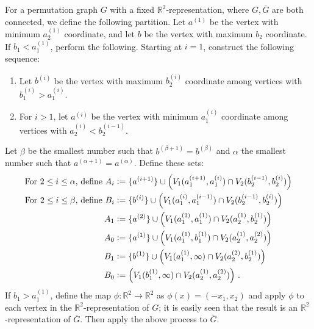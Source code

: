 \documentclass{theoretics}
\newcommand{\define}{\vcentcolon=}
\newcommand{\bR}{\ensuremath{\mathbb{R}}}
\begin{document}
\begin{definition}
	\label{def:permutation decomposition}
	For a permutation graph $G$ with a fixed $\bR^2$-representation, where $G,\overline G$ are both
	connected, we define the following partition.  Let $a^{(1)}$ be the vertex with minimum $a^{(1)}_2$
	coordinate, and let $b$ be the vertex with maximum $b_2$ coordinate. If $b_1 < a^{(1)}_1$, perform
	the following. Starting at $i=1$, construct the following sequence:
	\begin{enumerate}[label=\textup{(\arabic*)}]
		\item Let $b^{(i)}$ be the vertex with maximum $b^{(i)}_2$ coordinate among vertices with $b^{(i)}_1
		> a^{(i)}_1$.
		\item For $i > 1$, let $a^{(i)}$ be the vertex with minimum $a^{(i)}_1$ coordinate among
		vertices with $a^{(i)}_2 < b^{(i-1)}_2$.
	\end{enumerate}
	Let $\beta$ be the smallest number such that $b^{(\beta+1)}=b^{(\beta)}$ and $\alpha$ the smallest number
	such that $a^{(\alpha+1)}=a^{(\alpha)}$. Define these sets:
	\begin{align*}
		\text{For $2 \leq i \leq \alpha$, define } A_i &\define \{a^{(i+1)}\} \cup
		\left( V_1(a^{(i+1)}_1, a^{(i)}_1) \cap V_2(b^{(i-1)}_2, b^{(i)}_2) \right) \\
		\text{For $2 \leq i \leq \beta$, define } B_i &\define \{b^{(i)}\} \cup
		\left( V_1(a^{(i)}_1, a^{(i-1)}_1) \cap V_2(b^{(i-1)}_2, b^{(i)}_2) \right) \\
		A_1 &\define \{a^{(2)}\} \cup
		\left( V_1(a^{(2)}_1, a^{(1)}_1) \cap V_2(a^{(1)}_2, b^{(1)}_2)\right) \\
		A_0 &\define \{a^{(1)}\} \cup
		\left( V_1(a^{(1)}_1, b^{(1)}_1) \cap V_2(a^{(1)}_2, a^{(2)}_2) \right) \\
		B_1 &\define \{b^{(1)}\} \cup
		\left( V_1(a^{(1)}_1, \infty) \cap V_2(a^{(2)}_2, b^{(1)}_2) \right) \\
		B_0 &\define 
		\left( V_1(b^{(1)}_1, \infty) \cap V_2(a^{(1)}_2, a^{(2)}_2) \right) \,.
	\end{align*}
	If $b_1 > a^{(1)}_1$, define the map $\phi : \bR^2 \to \bR^2$ as $\phi(x) = (-x_1,x_2)$ and apply
	$\phi$ to each vertex in the $\bR^2$-representation of $G$; it is easily seen that the result is an
	$\bR^2$-representation of $\overline G$. Then apply the above process to $\overline G$.
\end{definition}
\end{document}
